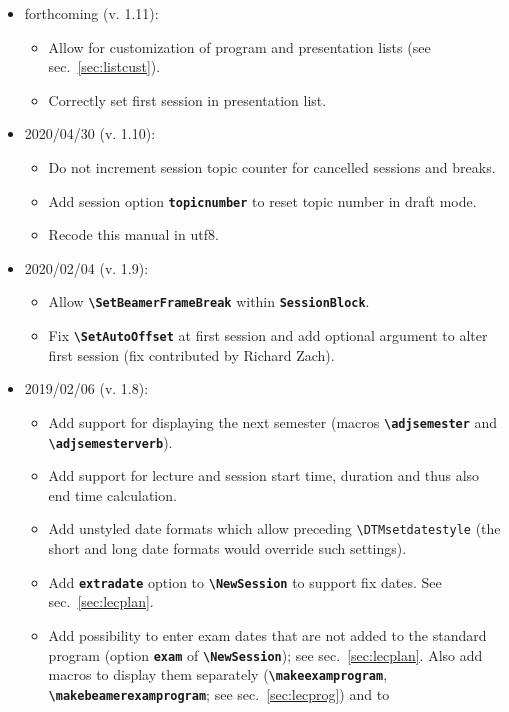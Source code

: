 \documentclass[english]{article}
\newcommand*\jmacro[1]{\textbf{\texttt{#1}}}
\newcommand*\jcsmacro[1]{\jmacro{\textbackslash{#1}}}
\newcommand*\joption[1]{\textbf{\texttt{#1}}}
\newcommand*\jfmacro[1]{\texttt{#1}}
\newcommand*\jfcsmacro[1]{\jfmacro{\textbackslash{#1}}}
\begin{document}
\begin{itemize}
\item forthcoming (v. 1.11):
	\begin{itemize}
		\item Allow for customization of program and presentation lists (see sec.~\ref{sec:listcust}).
		\item Correctly set first session in presentation list.
	\end{itemize}
\item 2020/04/30 (v. 1.10):
	\begin{itemize}
		\item Do not increment session topic counter for cancelled sessions and breaks.
		\item Add session option \joption{topicnumber} to reset topic number in draft mode.
		\item Recode this manual in utf8.
	\end{itemize}
\item 2020/02/04 (v. 1.9):
	\begin{itemize}
		\item Allow \jcsmacro{SetBeamerFrameBreak} within \joption{SessionBlock}.
		\item Fix \jcsmacro{SetAutoOffset} at first session and add optional argument
		      to alter first session (fix contributed by Richard Zach).
	\end{itemize}
\item 2019/02/06 (v. 1.8):
	\begin{itemize}
		\item Add support for displaying the next semester (macros \jcsmacro{adjsemester} and
		      \jcsmacro{adjsemesterverb}).
		\item Add support for lecture and session start time, duration and thus also end time
		      calculation.
		\item Add unstyled date formats which allow preceding \jfcsmacro{DTMsetdatestyle}
		      (the short and long date formats would override such settings).
		\item Add \joption{extradate} option to \jcsmacro{NewSession} to support fix dates.
		      See sec.~\ref{sec:lecplan}.
		\item Add possibility to enter exam dates that are not added to the standard program
		      (option \joption{exam} of \jcsmacro{NewSession}); see sec.~\ref{sec:lecplan}.
		      Also add macros to display them separately (\jcsmacro{makeexamprogram},
		      \jcsmacro{makebeamerexamprogram}; see sec.~\ref{sec:lecprog}) and to

\end{itemize}
\end{itemize}
\end{document}
